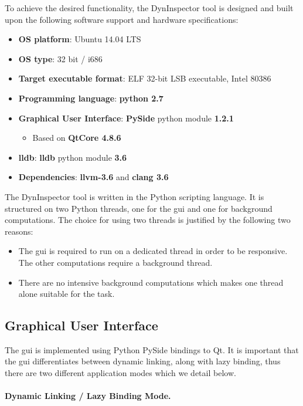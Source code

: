 To achieve the desired functionality, the DynInspector tool is designed and built upon the following software support and hardware specifications:

\begin{itemize}
\item \textbf{OS platform}: Ubuntu 14.04  LTS
\item \textbf{OS type}: 32 bit / i686
\item \textbf{Target executable format}: ELF 32-bit LSB  executable, Intel 80386
\item \textbf{Programming language}: \textbf{python 2.7}
\item \textbf{Graphical User Interface}: \textbf{PySide} python module \textbf{1.2.1}
\begin{itemize}
\item Based on \textbf{QtCore 4.8.6}
\end{itemize}
\item \textbf{lldb}: \textbf{lldb} python module \textbf{3.6}
\item \textbf{Dependencies}: \textbf{llvm-3.6} and \textbf{clang 3.6}
\end{itemize}

The DynInspector tool is written in the Python scripting language. It is structured on two Python threads, one for the gui and one for background computations. The choice for using two threads is justified by the following two reasons:
\begin{itemize}
\item The gui is required to run on a dedicated thread in order to be responsive. The other computations require a background thread.
\item There are no intensive background computations which makes one thread alone suitable for the task.
\end{itemize}

\subsection{Graphical User Interface}

The gui is implemented using Python PySide bindings to Qt. It is important that the gui differentiates between dynamic linking, along with lazy binding, thus there are two different application modes which we detail below.

\paragraph{Dynamic Linking / Lazy Binding Mode.}

